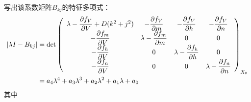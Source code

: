 \documentclass[
    bachelor,
    nofont, %
    pdflinks,
    ]{xjtuthesis}
\begin{document}
写出该系数矩阵$B _{kj}$的特征多项式：
\begin{align}
|\lambda I - B _{kj}|
& =\det \left(               
  \begin{array}{cccc}   
    \lambda-\dfrac{\partial f_V}{\partial V}+D(k^2+j^2) & -\dfrac{\partial f_V}{\partial m} & -\dfrac{\partial f_V}{\partial h} &- \dfrac{\partial f_V}{\partial n}\\  
    -\dfrac{\partial f_m}{\partial V} &\lambda- \dfrac{\partial f_m}{\partial m} & 0 & 0\\   
    -\dfrac{\partial f_h}{\partial V} & 0  & \lambda-\dfrac{\partial f_h}{\partial h} & 0 \\
    -\dfrac{\partial f_n}{\partial V} & 0 & 0 & \lambda-\dfrac{\partial f_n}{\partial n} 
  \end{array}
\right)_{X_0}\\
\notag &= a_4 \lambda^4 +a_3 \lambda^3 +a_2 \lambda^2 +a_1 \lambda +a_0
\end{align}
其中
\end{document}
